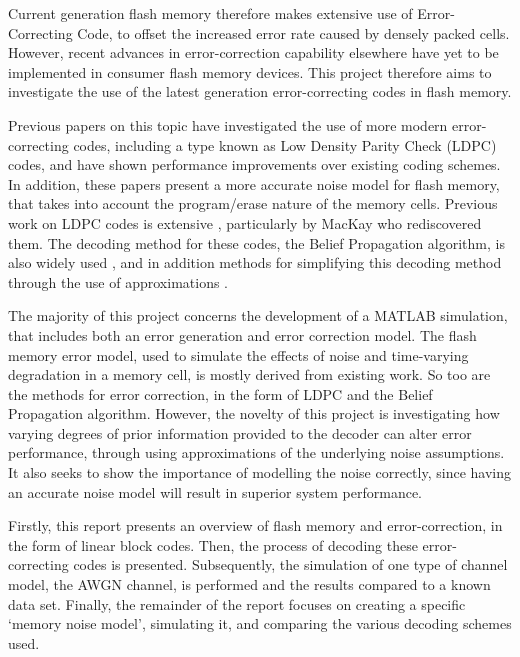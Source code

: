 \documentclass[11pt]{article}
\numberwithin{equation}{subsection}
\begin{document}
Current generation flash memory therefore makes extensive use of Error-Correcting Code, to offset the increased error rate caused by densely packed cells. However, recent advances in error-correction capability elsewhere have yet to be implemented in consumer flash memory devices. This project therefore aims to investigate the use of the latest generation error-correcting codes in flash memory. 

Previous papers \cite{dong2012estimating,DBLP:journals/corr/abs-1210-0149} on this topic have investigated the use of more modern error-correcting codes, including a type known as Low Density Parity Check (LDPC) codes, and have shown performance improvements over existing coding schemes. In addition, these papers present a more accurate noise model for flash memory, that takes into account the program/erase nature of the memory cells. Previous work on LDPC codes is extensive \cite{mncisit,gallager1962low}, particularly by MacKay who rediscovered them. The decoding method for these codes, the Belief Propagation algorithm, is also widely used \cite{davey1998low,chen2002near}, and in addition methods for simplifying this decoding method through the use of approximations \cite{zhao2005implementation,chen2005reduced,islam2011optimized}.

The majority of this project concerns the development of a MATLAB simulation, that includes both an error generation and error correction model. The flash memory error model, used to simulate the effects of noise and time-varying degradation in a memory cell, is mostly derived from existing work. So too are the methods for error correction, in the form of LDPC and the Belief Propagation algorithm. However, the novelty of this project is investigating how varying degrees of prior information provided to the decoder can alter error performance, through using approximations of the underlying noise assumptions. It also seeks to show the importance of modelling the noise correctly, since having an accurate noise model will result in superior system performance.

Firstly, this report presents an overview of flash memory and error-correction, in the form of linear block codes. Then, the process of decoding these error-correcting codes is presented. Subsequently, the simulation of one type of channel model, the AWGN channel, is performed and the results compared to a known data set. Finally, the remainder of the report focuses on creating a specific `memory noise model', simulating it, and comparing the various decoding schemes used.
\end{document}
